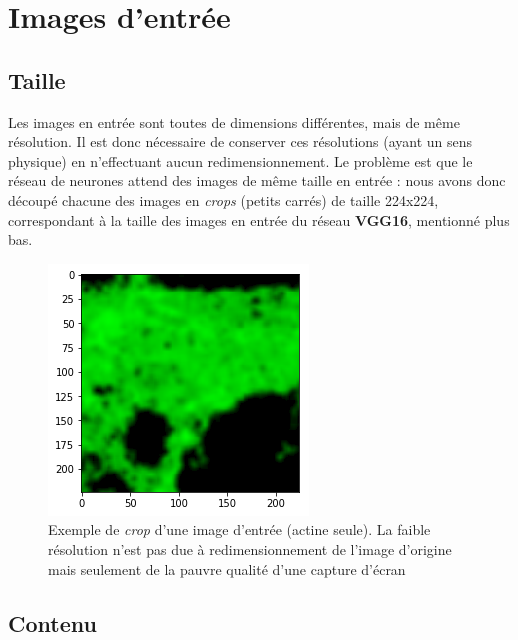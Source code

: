 \documentclass{report}
\begin{document}
\section{Images d'entrée}

\subsection{Taille}

Les images en entrée sont toutes de dimensions différentes, mais de même résolution.
Il est donc nécessaire de conserver ces résolutions (ayant un sens physique) en
n'effectuant aucun redimensionnement. Le problème est que le réseau de neurones
attend des images de même taille en entrée : nous avons donc découpé chacune des
images en \textit{crops} (petits carrés) de taille 224x224, correspondant à la taille
des images en entrée du réseau \textbf{VGG16}, mentionné plus bas.

\begin{figure}[H]
\centering
\includegraphics[scale=0.35]{"ex_crop"}
\caption{Exemple de \textit{crop} d'une image d'entrée (actine seule). La faible
résolution n'est pas due à redimensionnement de l'image d'origine mais
seulement de la pauvre qualité d'une capture d'écran}
\end{figure}

\subsection{Contenu}
\end{document}
